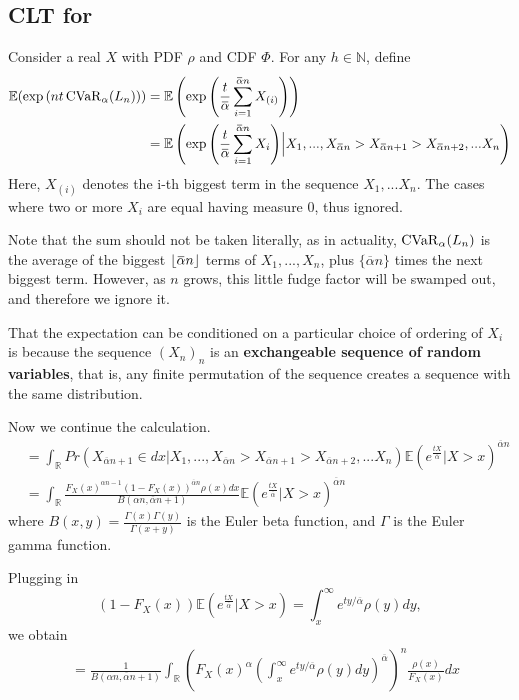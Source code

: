 \subsection{CLT for \cvar}
\label{sec:clt_cvar}

Consider a real $X$ with PDF $\rho$ and CDF $\Phi$. For any $h \in \mathbb{N}$, define 
\begin{align*}
\label{eq:temp_1}
\mathbb{E}(\exp{(nt \cvar_\alpha(L_n))}) &= \mathbb{E}\left(\exp{\left( \frac{t}{\overbar{\alpha}} \sum_{i=1}^{\overbar{\alpha} n} X_{(i)} \right)}\right) \\
&= \mathbb{E}\left(\exp{\left( \frac{t}{\overbar{\alpha}} \sum_{i=1}^{\overbar{\alpha} n} X_i \right)} \Big| X_1, ..., X_{\overbar{\alpha} n} > X_{\overbar{\alpha} n + 1} > X_{\overbar{\alpha} n + 2} , ... X_n\right) 
\end{align*}
Here, $X_{(i)}$ denotes the i-th biggest term in the sequence $X_1, ... X_n$. The cases where two or more $X_i$ are equal having measure $0$, thus ignored.

Note that the sum should not be taken literally, as in actuality, $\operatorname{CVaR}_\alpha(L_n)$ is the average of the biggest $\floor{\overbar{\alpha} n}$ terms of $X_1, ..., X_n$, plus $\{\overbar{\alpha} n\}$ times the next biggest term. However, as $n$ grows, this little fudge factor will be swamped out, and therefore we ignore it.

That the expectation can be conditioned on a particular choice of ordering of $X_i$ is because the sequence $(X_n)_n$ is an \textbf{exchangeable sequence of random variables}, that is, any finite permutation of the sequence creates a sequence with the same distribution.

Now we continue the calculation.
\begin{align*}
&= \int_{\mathbb{R}} Pr(X_{\overbar{\alpha} n + 1}\in dx |  X_1, ..., X_{\overbar{\alpha} n} > X_{\overbar{\alpha} n + 1} > X_{\overbar{\alpha} n + 2} , ... X_n) \mathbb{E}(e^{\frac{tX}{\overbar{\alpha}}} | X > x)^{\overbar{\alpha} n} \\
&= \int_{\mathbb{R}} 
\frac{F_X(x)^{\alpha n - 1}(1-F_X(x))^{\overbar{\alpha} n} \rho(x) dx}{B(\alpha n, \overbar{\alpha} n + 1)}
\mathbb{E}(e^{\frac{tX}{\overbar{\alpha}}} | X > x)^{\overbar{\alpha} n}
\end{align*}
where $B(x, y) = \frac{\Gamma(x)\Gamma(y)}{\Gamma(x+y)}$ is the Euler beta function, and $\Gamma$ is the Euler gamma function.

Plugging in 
$$(1-F_X(x))\mathbb{E}(e^{\frac{tX}{\overbar{\alpha}}} | X > x) = \int_x^\infty  e^{ty/\overbar{\alpha}} \rho(y)dy, $$
we obtain
\begin{align*}
&= \frac{1}{B(\alpha n, \overbar{\alpha} n + 1)}\int_{\mathbb{R}} 
\left(F_X(x)^\alpha \left(\int_x^\infty  e^{ty/\overbar{\alpha}} \rho(y)dy\right)^{\overbar{\alpha}}\right)^n
\frac{\rho(x)}{F_X(x)}dx
\end{align*}

